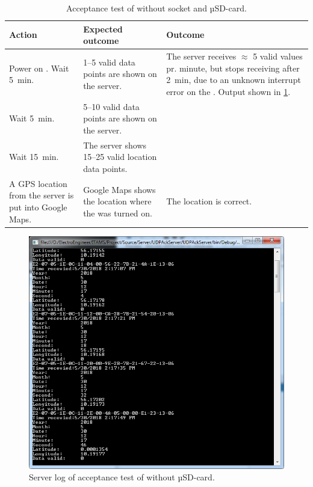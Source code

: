 \begin{table}[H]
	\centering
	\begin{tabularx}{\textwidth}{p{4.3cm} X X}
		\toprule
		\textbf{Action} & \textbf{Expected outcome} & \textbf{Outcome} \\
		\midrule
		Power on \systemName. Wait \SI{5}{\minute}. & \numrange{1}{5} valid data points are shown on the server. & The server receives $\approx$ 5 valid values pr. minute, but stops receiving after \SI{2}{\minute}, due to an unknown interrupt error on the \SAMD. Output shown in \cref{fig:accepttestconsole}. \\
		Wait \SI{5}{\minute}. & \numrange{5}{10} valid data points are shown on the server. & \\
		Wait \SI{15}{\minute}. & The server shows \numrange{15}{25} valid location data points. & \\
		A GPS location from the server is put into Google Maps. & Google Maps shows the location where the \systemName was turned on. & The location is correct. \\
		\bottomrule
	\end{tabularx}
	\caption{Acceptance test of \systemName without \SDsock socket and µSD-card.}
	\label{AT:withoutSD}
\end{table}

\begin{figure}
	\centering
	\includegraphics[width=0.9\linewidth]{gfx/Test/AcceptTestConsole.PNG}
	\caption{Server log of acceptance test of \systemName without µSD-card.}
	\label{fig:accepttestconsole}
\end{figure}

\FloatBarrier